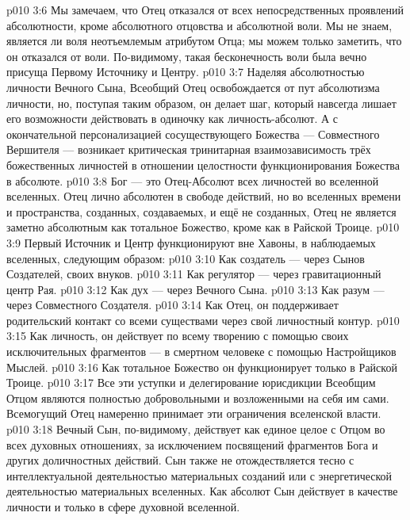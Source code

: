 \vs p010 3:6 Мы замечаем, что Отец отказался от всех непосредственных проявлений абсолютности, кроме абсолютного отцовства и абсолютной воли. Мы не знаем, является ли воля неотъемлемым атрибутом Отца; мы можем только заметить, что он  отказался от воли. По\hyp{}видимому, такая бесконечность воли была вечно присуща Первому Источнику и Центру.
\vs p010 3:7 Наделяя абсолютностью личности Вечного Сына, Всеобщий Отец освобождается от пут абсолютизма личности, но, поступая таким образом, он делает шаг, который навсегда лишает его возможности действовать в одиночку как личность\hyp{}абсолют. А с окончательной персонализацией сосуществующего Божества --- Совместного Вершителя --- возникает критическая тринитарная взаимозависимость трёх божественных личностей в отношении целостности функционирования Божества в абсолюте.
\vs p010 3:8 Бог --- это Отец\hyp{}Абсолют всех личностей во вселенной вселенных. Отец лично абсолютен в свободе действий, но во вселенных времени и пространства, созданных, создаваемых, и ещё не созданных, Отец не является заметно абсолютным как тотальное Божество, кроме как в Райской Троице.
\vs p010 3:9 \pc Первый Источник и Центр функционируют вне Хавоны, в наблюдаемых вселенных, следующим образом:
\vs p010 3:10 Как создатель --- через Сынов Создателей, своих внуков.
\vs p010 3:11 Как регулятор --- через гравитационный центр Рая.
\vs p010 3:12 Как дух --- через Вечного Сына.
\vs p010 3:13 Как разум --- через Совместного Создателя.
\vs p010 3:14 Как Отец, он поддерживает родительский контакт со всеми существами через свой личностный контур.
\vs p010 3:15 Как личность, он действует  по всему творению с помощью своих исключительных фрагментов --- в смертном человеке с помощью Настройщиков Мыслей.
\vs p010 3:16 Как тотальное Божество он функционирует только в Райской Троице.
\vs p010 3:17 \pc Все эти уступки и делегирование юрисдикции Всеобщим Отцом являются полностью добровольными и возложенными на себя им сами. Всемогущий Отец намеренно принимает эти ограничения вселенской власти.
\vs p010 3:18 \pc Вечный Сын, по\hyp{}видимому, действует как единое целое с Отцом во всех духовных отношениях, за исключением посвящений фрагментов Бога и других доличностных действий. Сын также не отождествляется тесно с интеллектуальной деятельностью материальных созданий или с энергетической деятельностью материальных вселенных. Как абсолют Сын действует в качестве личности и только в сфере духовной вселенной.
